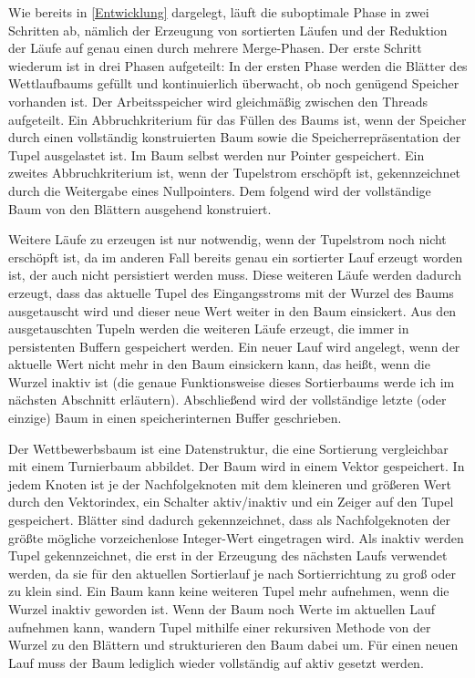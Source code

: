 \documentclass[a4paper,12pt,twoside]{article}
\begin{document}
Wie bereits in \autoref{Entwicklung} dargelegt, läuft die suboptimale Phase in zwei Schritten ab, nämlich der Erzeugung von sortierten Läufen und der Reduktion der Läufe auf genau einen durch mehrere Merge-Phasen. Der erste Schritt wiederum ist in drei Phasen aufgeteilt: In der ersten Phase werden die Blätter des Wettlaufbaums gefüllt und kontinuierlich überwacht, ob noch genügend Speicher vorhanden ist. Der Arbeitsspeicher wird gleichmäßig zwischen den Threads aufgeteilt. Ein Abbruchkriterium für das Füllen des Baums ist, wenn der Speicher durch einen vollständig konstruierten Baum sowie die Speicherrepräsentation der Tupel ausgelastet ist. Im Baum selbst werden nur Pointer gespeichert. Ein zweites Abbruchkriterium ist, wenn der Tupelstrom erschöpft ist, gekennzeichnet durch die Weitergabe eines Nullpointers. Dem folgend wird der vollständige Baum von den Blättern ausgehend konstruiert.

Weitere Läufe zu erzeugen ist nur notwendig, wenn der Tupelstrom noch nicht erschöpft ist, da im anderen Fall bereits genau ein sortierter Lauf erzeugt worden ist, der auch nicht persistiert werden muss. Diese weiteren Läufe werden dadurch erzeugt, dass das aktuelle Tupel des Eingangsstroms mit der Wurzel des Baums ausgetauscht wird und dieser neue Wert weiter in den Baum einsickert. Aus den ausgetauschten Tupeln werden die weiteren Läufe erzeugt, die immer in persistenten Buffern gespeichert werden. Ein neuer Lauf wird angelegt, wenn der aktuelle Wert nicht mehr in den Baum einsickern kann, das heißt, wenn die Wurzel inaktiv ist (die genaue Funktionsweise dieses Sortierbaums werde ich im nächsten Abschnitt erläutern). Abschließend wird der vollständige letzte (oder einzige) Baum in einen speicherinternen Buffer geschrieben.

Der Wettbewerbsbaum ist eine Datenstruktur, die eine Sortierung vergleichbar mit einem Turnierbaum abbildet. Der Baum wird in einem Vektor gespeichert. In jedem Knoten ist je der Nachfolgeknoten mit dem kleineren und größeren Wert durch den Vektorindex, ein Schalter aktiv/inaktiv und ein Zeiger auf den Tupel gespeichert. Blätter sind dadurch gekennzeichnet, dass als Nachfolgeknoten der größte mögliche vorzeichenlose Integer-Wert eingetragen wird. Als inaktiv werden Tupel gekennzeichnet, die erst in der Erzeugung des nächsten Laufs verwendet werden, da sie für den aktuellen Sortierlauf je nach Sortierrichtung zu groß oder zu klein sind. Ein Baum kann keine weiteren Tupel mehr aufnehmen, wenn die Wurzel inaktiv geworden ist. Wenn der Baum noch Werte im aktuellen Lauf aufnehmen kann, wandern Tupel mithilfe einer rekursiven Methode von der Wurzel zu den Blättern und strukturieren den Baum dabei um. Für einen neuen Lauf muss der Baum lediglich wieder vollständig auf aktiv gesetzt werden. 
\end{document}
